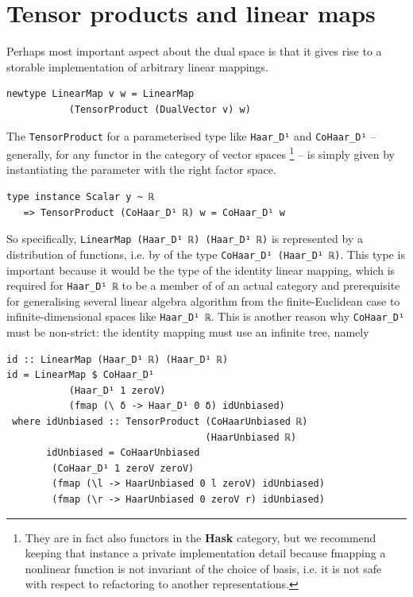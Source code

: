 \documentclass[sigplan,review,anonymous]{acmart}\settopmatter{printfolios=true,printccs=false,printacmref=false}
\begin{document}
\section{Tensor products and linear maps}
Perhaps most important aspect about the dual space is that it gives rise to a storable implementation of arbitrary linear mappings.
\begin{lstlisting}
newtype LinearMap v w = LinearMap
           (TensorProduct (DualVector v) w)
\end{lstlisting}
The \lstinline`TensorProduct` for a parameterised type like \lstinline`Haar_D¹` and \lstinline`CoHaar_D¹` -- generally, for any functor in the category of vector spaces%
\footnote{They are in fact also functors in the \textbf{Hask} category, but we recommend keeping that instance a private implementation detail because fmapping a nonlinear function is not invariant of the choice of basis, i.e. it is not safe with respect to refactoring to another representations.
} -- is simply given by instantiating the parameter with the right factor space.
\begin{lstlisting}
type instance Scalar y ~ ℝ
   => TensorProduct (CoHaar_D¹ ℝ) w = CoHaar_D¹ w
\end{lstlisting}
So specifically, \lstinline`LinearMap (Haar_D¹ ℝ) (Haar_D¹ ℝ)` is represented by a distribution of functions, i.e. by of the type \lstinline`CoHaar_D¹ (Haar_D¹ ℝ)`.
This type is important because it would be the type of the identity linear mapping, which is required for \lstinline`Haar_D¹ ℝ` to be a member of of an actual category and prerequisite for generalising several linear algebra algorithm from the finite-Euclidean case to infinite-dimensional spaces like \lstinline`Haar_D¹ ℝ`.
This is another reason why \lstinline`CoHaar_D¹` must be non-strict: the identity mapping must use an infinite tree, namely
\begin{lstlisting}
id :: LinearMap (Haar_D¹ ℝ) (Haar_D¹ ℝ)
id = LinearMap $ CoHaar_D¹
           (Haar_D¹ 1 zeroV)
           (fmap (\ δ -> Haar_D¹ 0 δ) idUnbiased)
 where idUnbiased :: TensorProduct (CoHaarUnbiased ℝ)
                                   (HaarUnbiased ℝ)
       idUnbiased = CoHaarUnbiased
        (CoHaar_D¹ 1 zeroV zeroV)
        (fmap (\l -> HaarUnbiased 0 l zeroV) idUnbiased)
        (fmap (\r -> HaarUnbiased 0 zeroV r) idUnbiased)
\end{lstlisting}
\end{document}
